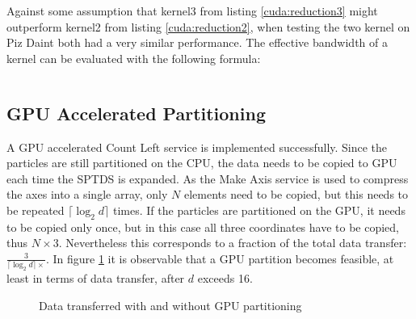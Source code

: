 \documentclass[]{article}
\begin{document}
Against some assumption that kernel3 from listing \ref{cuda:reduction3} might outperform kernel2 from listing \ref{cuda:reduction2}, when testing the two kernel on Piz Daint both had a very similar performance. The effective bandwidth of a kernel can be evaluated with the following formula: 

\begin{equation}
	
\end{equation}

\subsection{GPU Accelerated Partitioning}

A GPU accelerated Count Left service is implemented successfully. Since the particles are still partitioned on the CPU, the data needs to be copied to GPU each time the SPTDS is expanded. As the Make Axis service is used to compress the axes into a single array, only $N$ elements need to be copied, but this needs to be repeated $\lceil \log_2 d \rceil$ times. 
If the particles are partitioned on the GPU, it needs to be copied only once, but in this case all three coordinates have to be copied, thus $
N \times 3$. Nevertheless this corresponds to a fraction of the total data transfer: $\frac{3}{\lceil \log_2 d \rceil \times}$. In figure \ref{fig:transfer} it is observable that a GPU partition becomes feasible, at least in terms of data transfer, after $d$ exceeds 16. 

\begin{figure}[H]
	\begin{center}
		\caption{Data transferred with and without GPU partitioning}
		\label{fig:transfer}
	\end{center}
\end{figure}
\end{document}
